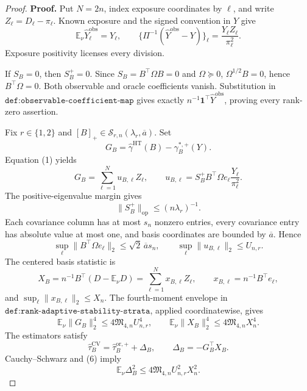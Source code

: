 \documentclass{article}
\begin{document}
\begin{proof}
\textbf{Proof.}
Put \(N=2n\), index exposure coordinates by \(\ell\), and write \(Z_\ell=D_\ell-\pi_\ell\).  Known exposure and the signed convention in \(Y\) give
\[
\mathbb E_\nu\widehat Y_\ell^{\mathrm{obs}}=Y_\ell,
\qquad
\{\Pi^{-1}(\widehat Y^{\mathrm{obs}}-Y)\}_\ell
=\frac{Y_\ell Z_\ell}{\pi_\ell^2}.
\tag{1}
\]
Exposure positivity licenses every division.

If \(S_B=0\), then \(S_B^+=0\).  Since \(S_B=B^{\top}\Omega B=0\) and \(\Omega\succeq0\), \(\Omega^{1/2}B=0\), hence \(B^{\top}\Omega=0\).  Both observable and oracle coefficients vanish.  Substitution in \(\texttt{def:observable-coefficient-map}\) gives exactly \(n^{-1}\mathbf1^{\top}\widehat Y^{\mathrm{obs}}\), proving every rank-zero assertion.

Fix \(r\in\{1,2\}\) and \([B]_+\in\mathcal S_{r,n}(\lambda_r,\overline a)\).  Set
\[
G_B=\widehat\gamma^{\mathrm{HT}}(B)-\gamma_B^{*,+}(Y).
\]
Equation (1) yields
\[
G_B=\sum_{\ell=1}^{N}u_{B,\ell}Z_\ell,
\qquad
u_{B,\ell}=S_B^+B^{\top}\Omega e_\ell\frac{Y_\ell}{\pi_\ell^2}.
\tag{2}
\]
The positive-eigenvalue margin gives
\[
\lVert S_B^+\rVert_{\mathrm{op}}\le(n\lambda_r)^{-1}.
\tag{3}
\]
Each covariance column has at most \(s_n\) nonzero entries, every covariance entry has absolute value at most one, and basis coordinates are bounded by \(\overline a\).  Hence
\[
\sup_\ell\lVert B^{\top}\Omega e_\ell\rVert_2
\le\sqrt2\,\overline a s_n,
\qquad
\sup_\ell\lVert u_{B,\ell}\rVert_2\le U_{n,r}.
\tag{4}
\]
The centered basis statistic is
\[
X_B=n^{-1}B^{\top}(D-\mathbb E_\nu D)
=\sum_{\ell=1}^{N}x_{B,\ell}Z_\ell,
\qquad x_{B,\ell}=n^{-1}B^{\top}e_\ell,
\tag{5}
\]
and \(\sup_\ell\lVert x_{B,\ell}\rVert_2\le X_n\).  The fourth-moment envelope in \(\texttt{def:rank-adaptive-stability-strata}\), applied coordinatewise, gives
\[
\mathbb E_\nu\lVert G_B\rVert_2^4
\le4\mathfrak M_{4,n}U_{n,r}^4,
\qquad
\mathbb E_\nu\lVert X_B\rVert_2^4
\le4\mathfrak M_{4,n}X_n^4.
\tag{6}
\]
The estimators satisfy
\[
\widehat\tau_B^{\mathrm{CV}}
=\widehat\tau_B^{\mathrm{or},+}+\Delta_B,
\qquad \Delta_B=-G_B^{\top}X_B.
\tag{7}
\]
Cauchy--Schwarz and (6) imply
\[
\mathbb E_\nu\Delta_B^2
\le4\mathfrak M_{4,n}U_{n,r}^2X_n^2.
\tag{8}
\]


\end{proof}
\end{document}
